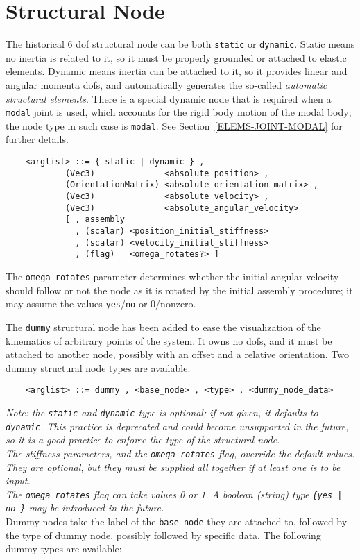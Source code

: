 \section{Structural Node}\label{sec:NODE-STRUCT}
The historical 6 dof structural node can be both \texttt{static}
or \texttt{dynamic}.
Static means no inertia is related to it, so it must be properly grounded 
or attached to elastic elements.
Dynamic means inertia can be attached to it, so it provides linear and
angular momenta dofs, and automatically generates the so-called 
{\em automatic structural elements}.
There is a special dynamic node that is required when a \texttt{modal} joint is
used, which accounts for the rigid body motion of the modal body; the node
type in such case is \texttt{modal}.
See Section~\ref{ELEMS-JOINT-MODAL} for further details.
\begin{verbatim}
    <arglist> ::= { static | dynamic } ,
            (Vec3)              <absolute_position> ,
            (OrientationMatrix) <absolute_orientation_matrix> ,
            (Vec3)              <absolute_velocity> ,
            (Vec3)              <absolute_angular_velocity>
            [ , assembly
              , (scalar) <position_initial_stiffness>
              , (scalar) <velocity_initial_stiffness>
              , (flag)   <omega_rotates?> ]
\end{verbatim}
The \texttt{omega\_rotates} parameter determines whether 
the initial angular velocity should follow or not the node 
as it is rotated by the initial assembly procedure; it may assume 
the values \texttt{yes}/\texttt{no} or 0/nonzero.

\noindent
The \texttt{dummy} structural node has been added to ease the visualization of
the kinematics of arbitrary points of the system. 
It owns no dofs, and it must be attached to another node, possibly with an
offset and a relative orientation.
Two dummy structural node types are available.
\begin{verbatim}
    <arglist> ::= dummy , <base_node> , <type> , <dummy_node_data>
\end{verbatim}
{\em 
    Note: the \texttt{static} and \texttt{dynamic} type is optional; if not given,
    it defaults to \texttt{dynamic}. 
    This practice is deprecated and could become unsupported in the future, 
    so it is a good practice to enforce the type of the structural node. \\
    The stiffness parameters, and the \texttt{omega\_rotates} flag, 
    override the default values. 
    They are optional, but they must be supplied all together if at least
    one is to be input. \\
    The \texttt{omega\_rotates} flag can take values 0 or 1. 
    A boolean (string) type \texttt{\{yes | no \}} may be introduced in the
    future. 
} \\
Dummy nodes take the label of the \texttt{base\_node} they are attached to, 
followed by the type of dummy node, possibly followed by specific data.
The following dummy types are available:

